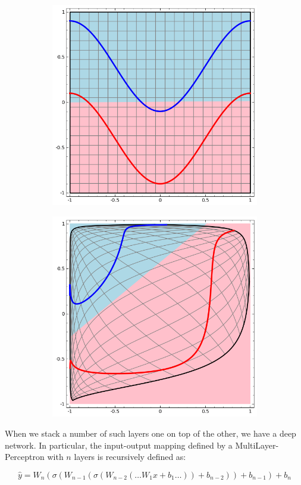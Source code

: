 \documentclass[../main.tex]{subfiles}
\begin{document}
    \begin{figure}[h!]
        \centering
        \begin{subfigure}{\textwidth}
            \centering
        	\includegraphics[width=.4\linewidth]{img/non-linearly-separable.png}\label{fig:nonlinearsep}
        \end{subfigure}
        \begin{subfigure}{\textwidth}
            \centering
        	\includegraphics[width=.4\linewidth]{img/linearly-separable.png}\label{fig:linearsep}
        \end{subfigure}
        \label{fig:linear-layer-viz}
	\end{figure}


    When we stack a number of such layers one on top of the other, we have a deep network. In particular, the input-output mapping defined by
    a MultiLayer-Perceptron with $n$ layers is recursively defined as:

    \begin{equation}
        \hat{y} = W_{n}(\sigma(W_{n-1}(\sigma(W_{n-2}(\ldots W_{1} x + b_{1} \ldots)) + b_{n-2})) + b_{n-1}) + b_{n} 
    \end{equation}
\end{document}

